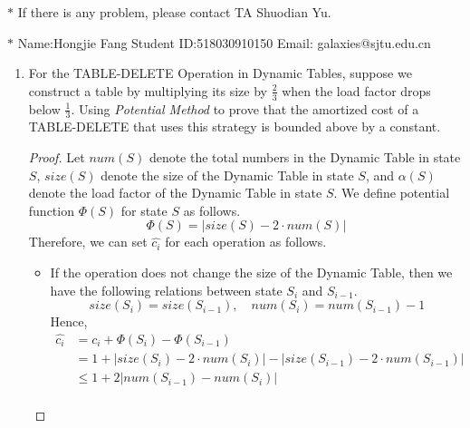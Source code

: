 \documentclass[12pt,a4paper]{article}
\theoremstyle{definition}
\begin{document}
\noindent

\noindent{}
\begin{center}
\footnotesize{\color{red}$*$ If there is any problem, please contact TA Shuodian Yu. }

\footnotesize{\color{blue}$*$ Name:Hongjie Fang  \quad Student ID:518030910150 \quad Email: galaxies@sjtu.edu.cn}
\end{center}
\begin{enumerate}
	\item For the TABLE-DELETE Operation in Dynamic Tables, suppose we construct a table by multiplying its size by $\frac 23$ when the load factor drops below $\frac 13$. Using \emph{Potential Method} to prove that the amortized cost of a TABLE-DELETE that uses this strategy is bounded above by a constant.
    \begin{proof}
    Let $num(S)$ denote the total numbers in the Dynamic Table in state $S$, $size(S)$ denote the size of the Dynamic Table in state $S$, and $\alpha(S)$ denote the load factor of the Dynamic Table in state $S$. We define potential function $\Phi(S)$ for state $S$ as follows.
    \begin{equation}
    \Phi(S) = \left|size(S) - 2\cdot num(S)\right|
    \label{eq1}
    \end{equation}
    Therefore, we can set $\hat{c_i}$ for each operation as follows.
    \begin{itemize}
    \item If the operation does not change the size of the Dynamic Table, then we have the following relations between state $S_i$ and $S_{i-1}$.
    \begin{displaymath}
    size(S_i) = size(S_{i-1}), \quad num(S_i) = num(S_{i-1}) - 1
    \end{displaymath}
    Hence,
    \begin{equation}
    \begin{aligned}
    \hat{c_i} & = c_i + \Phi(S_i) - \Phi(S_{i-1}) \\
              & = 1 + \left|size(S_i) - 2\cdot num(S_i)\right| - \left|size(S_{i-1}) - 2\cdot num(S_{i-1})\right| \\
              & \leq 1 + 2 \left|num(S_{i-1}) - num(S_i)\right| \\

\end{aligned}
\end{equation}
\end{itemize}
\end{proof}
\end{enumerate}
\end{document}
